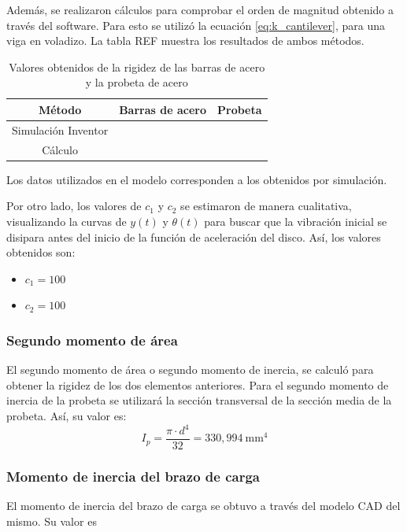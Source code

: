 Además, se realizaron cálculos para comprobar el orden de magnitud obtenido a través del software. Para esto se utilizó la ecuación \ref{eq:k_cantilever}, para una viga en voladizo.   La tabla REF muestra los resultados de ambos métodos.
\begin{table}[h]
\centering
\begin{tabular}{ccc}
\hline
Método & Barras de acero & Probeta \\ \hline
Simulación Inventor &  &  \\
Cálculo &  &  \\ \hline
\end{tabular}
\caption{Valores obtenidos de la rigidez de las barras de acero y la probeta de acero}
\label{tab:k_valor}
\end{table}
Los datos utilizados en el modelo corresponden a los obtenidos por simulación.

Por otro lado, los valores de $c_1$ y $c_2$ se estimaron de manera cualitativa, visualizando la curvas de $y(t)$ y $\theta(t)$ para buscar que la vibración inicial se disipara antes del inicio de la función de aceleración del disco. Así, los valores obtenidos son:
\begin{itemize}
	\item $c_1= 100$
	\item $c_2= 100$ 
\end{itemize}
\subsubsection{Segundo momento de área}
El segundo momento de área o segundo momento de inercia, se calculó para obtener la rigidez de los dos elementos anteriores. Para el segundo momento de inercia de la probeta se utilizará la sección transversal de la sección media de la probeta. Así, su valor es:
\begin{equation}
	I_p = \frac{\pi \cdot d^4}{32} = 330,994\: \text{mm}^4
\end{equation}

\subsubsection{Momento de inercia del brazo de carga}
El momento de inercia del brazo de carga se obtuvo a través del modelo CAD del mismo. Su valor es 

